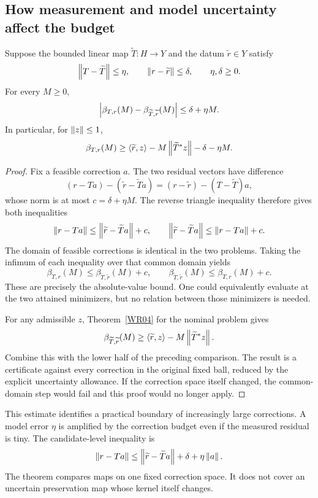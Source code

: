 \subsection{How measurement and model uncertainty affect the budget}
\begin{theorem}\label{WR05}
Suppose the bounded linear map $\widetilde T:H\to Y$ and the datum $\widetilde r\in Y$ satisfy
\[
 \left\lVert T-\widetilde T\right\rVert\le\eta,\qquad
 \left\lVert r-\widetilde r\right\rVert\le\delta,\qquad\eta,\delta\ge0.
\]
For every $M\ge0$,
\[
 \left\lvert\beta_{T,r}(M)-\beta_{\widetilde T,\widetilde r}(M)\right\rvert
 \le\delta+\eta M.
\]
In particular, for $\left\lVert z\right\rVert\le1$,
\[
 \beta_{T,r}(M)\ge
 \langle\widetilde r,z\rangle-M\left\lVert\widetilde T^*z\right\rVert
       -\delta-\eta M.
\]
\end{theorem}
\begin{proof}
Fix a feasible correction $a$. The two residual vectors have difference
\[
 (r-Ta)-(\widetilde r-\widetilde Ta)
 =(r-\widetilde r)-(T-\widetilde T)a,
\]
whose norm is at most $c=\delta+\eta M$. The reverse triangle inequality therefore gives both inequalities
\[
 \left\lVert r-Ta\right\rVert\le\left\lVert\widetilde r-\widetilde Ta\right\rVert+c,
 \qquad
 \left\lVert\widetilde r-\widetilde Ta\right\rVert\le\left\lVert r-Ta\right\rVert+c.
\]
The domain of feasible corrections is identical in the two problems. Taking the infimum of each inequality over that common domain yields
\[
 \beta_{T,r}(M)\le\beta_{\widetilde T,\widetilde r}(M)+c,
 \qquad
 \beta_{\widetilde T,\widetilde r}(M)\le\beta_{T,r}(M)+c.
\]
These are precisely the absolute-value bound. One could equivalently evaluate at the two attained minimizers, but no relation between those minimizers is needed.

For any admissible $z$, Theorem~\ref{WR04} for the nominal problem gives
\[
 \beta_{\widetilde T,\widetilde r}(M)
 \ge\langle\widetilde r,z\rangle-M\left\lVert\widetilde T^*z\right\rVert.
\]
Combine this with the lower half of the preceding comparison. The result is a certificate against every correction in the original fixed ball, reduced by the explicit uncertainty allowance. If the correction space itself changed, the common-domain step would fail and this proof would no longer apply.
\end{proof}

This estimate identifies a practical boundary of increasingly large corrections. A model error $\eta$ is amplified by the correction budget even if the measured residual is tiny. The candidate-level inequality is
\[
 \left\lVert r-Ta\right\rVert\le\left\lVert\widetilde r-\widetilde Ta\right\rVert+\delta+\eta\left\lVert a\right\rVert.
\]
The theorem compares maps on one fixed correction space. It does not cover an uncertain preservation map whose kernel itself changes.

